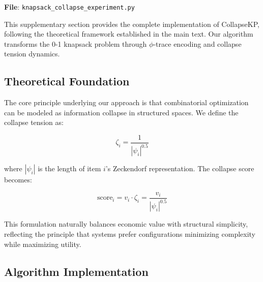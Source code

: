 \documentclass[11pt]{article}
\theoremstyle{remark}
\theoremstyle{definition}
\begin{document}
\textbf{File}: \texttt{knapsack\_collapse\_experiment.py}

This supplementary section provides the complete implementation of CollapseKP, following the theoretical framework established in the main text. Our algorithm transforms the 0-1 knapsack problem through $\phi$-trace encoding and collapse tension dynamics.

\subsection{Theoretical Foundation}

The core principle underlying our approach is that combinatorial optimization can be modeled as information collapse in structured spaces. We define the collapse tension as:

\begin{equation}
\zeta_i = \frac{1}{|\psi_i|^{0.5}}
\end{equation}

where $|\psi_i|$ is the length of item $i$'s Zeckendorf representation. The collapse score becomes:

\begin{equation}
\text{score}_i = v_i \cdot \zeta_i = \frac{v_i}{|\psi_i|^{0.5}}
\end{equation}

This formulation naturally balances economic value with structural simplicity, reflecting the principle that systems prefer configurations minimizing complexity while maximizing utility.

\subsection{Algorithm Implementation}
\end{document}
